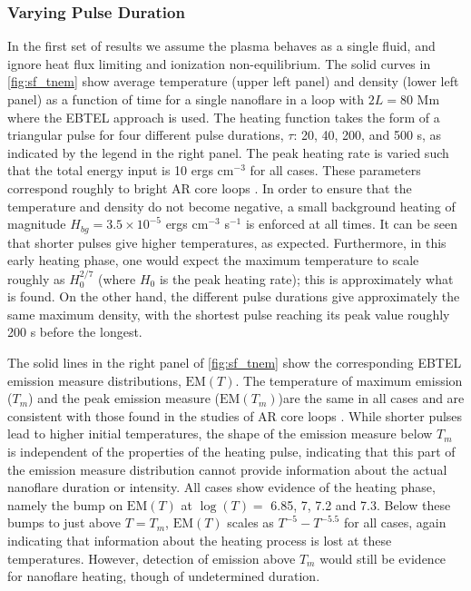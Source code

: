 \documentclass[]{aastex}
\begin{document}
	\subsubsection{Varying Pulse Duration}
	\label{subsubsec:pulse_res}
		\par In the first set of results we assume the plasma behaves as a single fluid, and ignore heat flux limiting and ionization non-equilibrium. The solid curves in \autoref{fig:sf_tnem} show average temperature (upper left panel) and density (lower left panel) as a function of time for a single nanoflare in a loop with $2L = 80$ Mm where the EBTEL approach is used.  The heating function takes the form of a triangular pulse for four different pulse durations, $\tau$: 20, 40, 200, and 500 s, as indicated by the legend in the right panel. The peak heating rate is varied such that the total energy input is 10 ergs cm$^{-3}$ for all cases. These parameters correspond roughly to bright AR core loops \citep{warren_systematic_2012}. In order to ensure that the temperature and density do not become negative, a small background heating of magnitude $H_{bg}=3.5\times10^{-5}$ ergs cm$^{-3}$ s$^{-1}$ is enforced at all times. It can be seen that shorter pulses give higher temperatures, as expected. Furthermore, in this early heating phase, one would expect the maximum temperature to scale roughly as $H_0^{2/7}$ (where $H_0$ is the peak heating rate); this is approximately what is found. On the other hand, the different pulse durations give approximately the same maximum density, with the shortest pulse reaching its peak value roughly 200 s before the longest. 
		\par The solid lines in the right panel of \autoref{fig:sf_tnem} show the corresponding EBTEL emission measure distributions, $\mathrm{EM}(T)$. The temperature of maximum emission ($T_m$) and the peak emission measure ($\mathrm{EM}(T_m)$)are the same in all cases and are consistent with those found in the studies of AR core loops \citep[e.g.][]{warren_systematic_2012}. While shorter pulses lead to higher initial temperatures, the shape of the emission measure below $T_m$ is independent of the properties of the heating pulse, indicating that this part of the emission measure distribution cannot provide information about the actual nanoflare duration or intensity. All cases show evidence of the heating phase, namely the bump on $\mathrm{EM}(T)$ at $\log{(T)} =$ 6.85, 7, 7.2 and 7.3. Below these bumps to just above $T = T_m$, $\mathrm{EM}(T)$ scales as $T^{-5}-T^{-5.5}$ for all cases, again indicating that information about the heating process is lost at these temperatures. However, detection of emission above $T_m$ would still be evidence for nanoflare heating, though of undetermined duration.  
\end{document}
